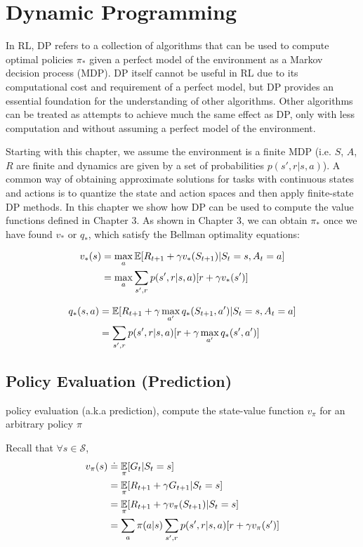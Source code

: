 \documentclass[sutton_barto_notes.tex]{subfiles}
\begin{document}
\newpage
\section{Dynamic Programming}

In RL, DP refers to a collection of algorithms that can be used to compute optimal policies $\pi_*$ given a perfect model of the environment as a Markov decision process (MDP).
DP itself cannot be useful in RL due to its computational cost and requirement of a perfect model, but DP provides an essential foundation for the understanding of other algorithms.
Other algorithms can be treated as attempts to achieve much the same effect as DP, only with less computation and without assuming a perfect model of the environment.

Starting with this chapter, we assume the environment is a finite MDP (i.e. $S$, $A$, $R$ are finite and dynamics are given by a set of probabilities $p(s',r|s,a)$).
A common way of obtaining approximate solutions for tasks with continuous states and actions is to quantize the state and action spaces and then apply finite-state DP methods.
In this chapter we show how DP can be used to compute the value functions defined in Chapter 3. As shown in Chapter 3, we can obtain $\pi_*$ once we have found $v_*$ or $q_*$, which satisfy the Bellman optimality equations:

\begin{align*}
v_*(s) & = \max_a \operatorname*{\mathbb{E}} [R_{t+1} + \gamma v_*(S_{t+1}) | S_t = s, A_t = a] \\
& = \max_a \sum_{s',r} p(s',r|s,a)[r + \gamma v_*(s')]
\end{align*}

\begin{align*}
q_*(s,a) & = \operatorname*{\mathbb{E}} [R_{t+1} + \gamma \max_{a'} q_*(S_{t+1},a') | S_t = s, A_t = a] \\
& = \sum_{s',r} p(s',r|s,a)[r+\gamma \max_{a'} q_*(s',a')]
\end{align*}

\subsection{Policy Evaluation (Prediction)}
\begin{definition}
policy evaluation (a.k.a prediction), compute the state-value function $v_\pi$ for an arbitrary policy $\pi$
\end{definition}

Recall that $\forall s \in \mathcal{S}$,
\begin{align*}
v_\pi(s) & \doteq \operatorname*{\mathbb{E}}_\pi [G_t | S_t = s] \\
& = \operatorname*{\mathbb{E}}_\pi [R_{t+1} + \gamma G_{t+1} | S_t = s] \\
& = \operatorname*{\mathbb{E}}_\pi [R_{t+1} + \gamma v_\pi (S_{t+1}) | S_t = s] \\
& = \sum_a \pi (a|s) \sum_{s',r} p(s',r|s,a) [r+\gamma v_\pi (s')]
\end{align*}
\end{document}
